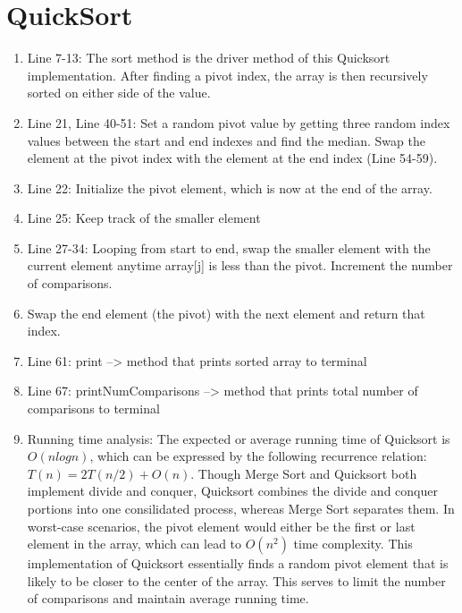 \documentclass[letterpaper, 10pt,DIV=13]{scrartcl}
\numberwithin{equation}{section} %
\numberwithin{figure}{section} %
\numberwithin{table}{section} %
\begin{document}
\section{QuickSort}
\begin{enumerate}
    \item Line 7-13: The sort method is the driver method of this Quicksort implementation. After finding a pivot index, the array is then recursively sorted on either side of the value.
    \item Line 21, Line 40-51: Set a random pivot value by getting three random index values between the start and end indexes and find the median. Swap the element at the pivot index with the element at the end index (Line 54-59).
    \item Line 22: Initialize the pivot element, which is now at the end of the array.
    \item Line 25: Keep track of the smaller element
    \item Line 27-34: Looping from start to end, swap the smaller element with the current element anytime array[j] is less than the pivot. Increment the number of comparisons.
    \item Swap the end element (the pivot) with the next element and return that index.
    \item Line 61: print --> method that prints sorted array to terminal
    \item Line 67: printNumComparisons --> method that prints total number of comparisons to terminal
    \item Running time analysis: The expected or average running time of Quicksort is $O(nlogn)$, which can be expressed by the following recurrence relation: $T(n) = 2T(n/2) + O(n)$. Though Merge Sort and Quicksort both implement divide and conquer, Quicksort combines the divide and conquer portions into one consilidated process, whereas Merge Sort separates them. In worst-case scenarios, the pivot element would either be the first or last element in the array, which can lead to $O(n^2)$ time complexity. This implementation of Quicksort essentially finds a random pivot element that is likely to be closer to the center of the array. This serves to limit the number of comparisons and maintain average running time.
    
\end{enumerate}
\end{document}
